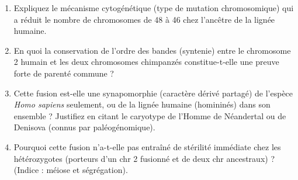 \documentclass[11pt]{article}
\begin{document}
\begin{exercice}
\begin{enumerate}
    \item Expliquez le mécanisme cytogénétique (type de mutation chromosomique) qui a réduit le nombre de chromosomes de 48 à 46 chez l'ancêtre de la lignée humaine.
    \item En quoi la conservation de l'ordre des bandes (syntenie) entre le chromosome 2 humain et les deux chromosomes chimpanzés constitue-t-elle une preuve forte de parenté commune ?
    \item Cette fusion est-elle une synapomorphie (caractère dérivé partagé) de l'espèce \emph{Homo sapiens} seulement, ou de la lignée humaine (homininés) dans son ensemble ? Justifiez en citant le caryotype de l'Homme de Néandertal ou de Denisova (connus par paléogénomique).
    \item Pourquoi cette fusion n'a-t-elle pas entraîné de stérilité immédiate chez les hétérozygotes (porteurs d'un chr 2 fusionné et de deux chr ancestraux) ? (Indice : méiose et ségrégation).
\end{enumerate}
\end{exercice}
\end{document}
